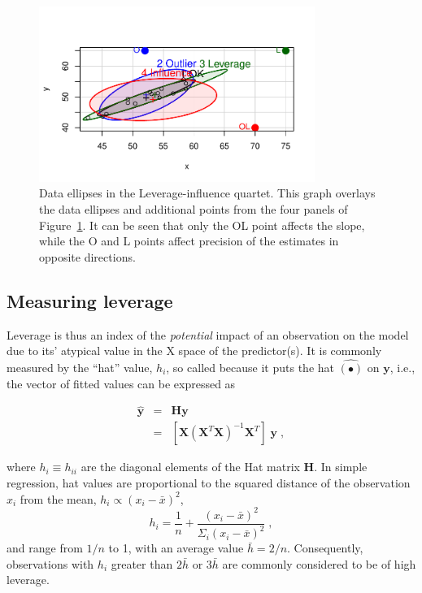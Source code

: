\documentclass[
  letterpaper,
  10pt,
  krantz2]{krantz}
\begin{document}
\begin{figure}[H]

{\centering \includegraphics[width=0.8\textwidth,height=\textheight]{figs/fig-levdemo2-1.pdf}

}

\caption{\label{fig-levdemo2}Data ellipses in the Leverage-influence
quartet. This graph overlays the data ellipses and additional points
from the four panels of Figure~\ref{fig-levdemo2}. It can be seen that
only the OL point affects the slope, while the O and L points affect
precision of the estimates in opposite directions.}

\end{figure}

\hypertarget{measuring-leverage}{%
\subsection{Measuring leverage}\label{measuring-leverage}}

Leverage is thus an index of the \emph{potential} impact of an
observation on the model due to its' atypical value in the X space of
the predictor(s). It is commonly measured by the ``hat'' value, \(h_i\),
so called because it puts the hat \(\hat{(\bullet)}\) on \(\mathbf{y}\),
i.e., the vector of fitted values can be expressed as

\begin{eqnarray*}
\hat{\mathbf{y}} & = & \mathbf{H} \mathbf{y} \\
                 & = & [\mathbf{X} (\mathbf{X}^T \mathbf{X})^{-1} \mathbf{X}^T] \; \mathbf{y} \; ,
\end{eqnarray*}

where \(h_i \equiv h_{ii}\) are the diagonal elements of the Hat matrix
\(\mathbf{H}\). In simple regression, hat values are proportional to the
squared distance of the observation \(x_i\) from the mean,
\(h_i \propto (x_i - \bar{x})^2\), \[
h_i = \frac{1}{n} + \frac{(x_i - \bar{x})^2}{\Sigma_i (x_i - \bar{x})^2} \; ,
\] and range from \(1/n\) to 1, with an average value \(\bar{h} = 2/n\).
Consequently, observations with \(h_i\) greater than \(2 \bar{h}\) or
\(3 \bar{h}\) are commonly considered to be of high leverage.
\end{document}
